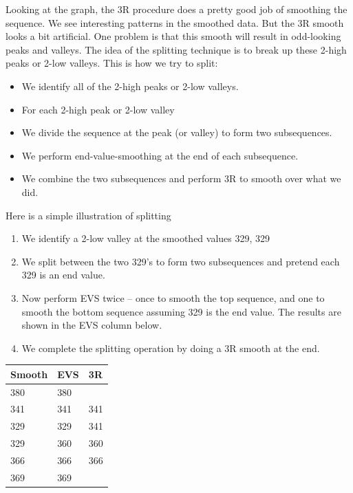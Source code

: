 \documentclass[
]{book}
\providecommand{\tightlist}{%
  \setlength{\itemsep}{0pt}\setlength{\parskip}{0pt}}
\begin{document}
Looking at the graph, the 3R procedure does a pretty good job of smoothing the sequence. We see interesting patterns in the smoothed data. But the 3R smooth looks a bit artificial. One problem is that this smooth will result in odd-looking peaks and valleys.
The idea of the splitting technique is to break up these 2-high peaks or 2-low valleys. This is how we try to split:

\begin{itemize}
\tightlist
\item
  We identify all of the 2-high peaks or 2-low valleys.
\item
  For each 2-high peak or 2-low valley
\item
  We divide the sequence at the peak (or valley) to form two subsequences.
\item
  We perform end-value-smoothing at the end of each subsequence.
\item
  We combine the two subsequences and perform 3R to smooth over what we did.
\end{itemize}

Here is a simple illustration of splitting

\begin{enumerate}
\def\labelenumi{\arabic{enumi}.}
\tightlist
\item
  We identify a 2-low valley at the smoothed values 329, 329
\item
  We split between the two 329's to form two subsequences and pretend each 329 is an end value.
\item
  Now perform EVS twice -- once to smooth the top sequence, and one to smooth the bottom sequence assuming 329 is the end value. The results are shown in the EVS column below.
\item
  We complete the splitting operation by doing a 3R smooth at the end.
\end{enumerate}

\begin{longtable}[]{@{}lll@{}}
\toprule
Smooth & EVS & 3R \\
\midrule
\endhead
380 & 380 & \\
341 & 341 & 341 \\
329 & 329 & 341 \\
329 & 360 & 360 \\
366 & 366 & 366 \\
369 & 369 & \\
\bottomrule
\end{longtable}
\end{document}
